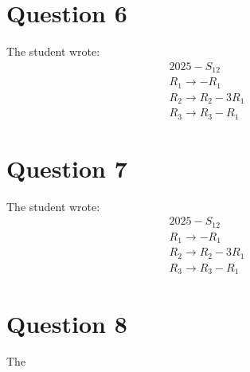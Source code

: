 \documentclass[12pt]{article}
\begin{document}
\section*{Question 6}
The student wrote:
\[
\begin{array}{l}
2025-S_{12} \\
R_{1} \rightarrow -R_{1} \\
R_{2} \rightarrow R_{2}-3R_{1} \\
R_{3} \rightarrow R_{3}-R_{1}
\end{array}
\]

\section*{Question 7}
The student wrote:
\[
\begin{array}{l}
2025-S_{12} \\
R_{1} \rightarrow -R_{1} \\
R_{2} \rightarrow R_{2}-3R_{1} \\
R_{3} \rightarrow R_{3}-R_{1}
\end{array}
\]

\section*{Question 8}
The
\end{document}
